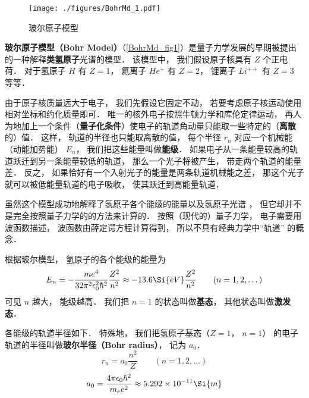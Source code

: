 

\begin{figure}[ht]
\centering
\texttt{[image: ./figures/BohrMd\_1.pdf]}
\caption{玻尔原子模型} \label{BohrMd_fig1}
\end{figure}

\textbf{玻尔原子模型（Bohr Model）}（\autoref{BohrMd_fig1}）是量子力学发展的早期被提出的一种解释\textbf{类氢原子}光谱的模型． 该模型中， 我们假设原子核具有 $Z$ 个正电荷． 对于氢原子 $H$ 有 $Z = 1$， 氦离子 $He^+$ 有 $Z = 2$， 锂离子 $Li^{++}$ 有 $Z = 3$ 等等．

由于原子核质量远大于电子， 我们先假设它固定不动， 若要考虑原子核运动使用相对坐标和约化质量即可．
唯一的核外电子按照牛顿力学和库伦定律运动， 再人为地加上一个条件（\textbf{量子化条件}）使电子的轨道角动量只能取一些特定的（\textbf{离散}的）值． 这样， 轨道的半径也只能取离散的值， 每个半径 $r_n$ 对应一个机械能（动能加势能） $E_n$， 我们把这些能量叫做\textbf{能级}． 如果电子从一条能量较高的轨道跃迁到另一条能量较低的轨道， 那么一个光子将被产生， 带走两个轨道的能量差． 反之， 如果恰好有一个入射光子的能量是两条轨道机械能之差， 那这个光子就可以被低能量轨道的电子吸收， 使其跃迁到高能量轨道．

虽然这个模型成功地解释了氢原子各个能级的能量以及氢原子光谱%
， 但它却并不是完全按照量子力学的的方法来计算的． 按照（现代的）量子力学， 电子需要用波函数描述， 波函数由薛定谔方程计算得到， 所以不具有经典力学中“轨道” 的概念．

根据玻尔模型， 氢原子的各个能级的能量为
\begin{equation}
E_n =  - \frac{m e^4}{32 \pi^2 \epsilon_0^2 \hbar ^2} \frac{Z^2}{n^2} \approx - 13.6\Si{eV} \frac{Z^2}{n^2}
\qquad (n = 1, 2, \dots)
\end{equation}
可见 $n$ 越大， 能级越高． 我们把 $n = 1$ 的状态叫做\textbf{基态}， 其他状态叫做\textbf{激发态}． 

各能级的轨道半径如下． 特殊地， 我们把氢原子基态（$Z = 1$， $n = 1$） 的电子轨道的半径叫做\textbf{玻尔半径（Bohr radius）}， 记为 $a_0$．
\begin{equation}\label{BohrMd_eq1}
r_n = a_0 \frac{n^2}{Z}
\qquad (n = 1, 2, \dots)
\end{equation}
\begin{equation}
a_0 = \frac{4\pi \epsilon_0 \hbar^2}{m_e e^2} \approx 5.292\times 10^{-11}\Si{m}
\end{equation}


